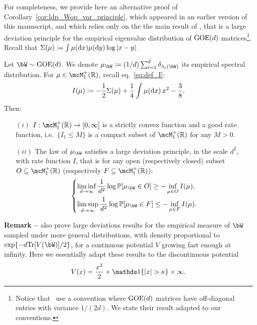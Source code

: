 For completeness, we provide here an alternative proof of Corollary~\ref{cor:ldp_Wop_var_principle}, which appeared in an earlier version of this manuscript,
and which relies only on the 
the main result of \cite{arous1997large}, that is a large deviation principle for the empirical eigenvalue distribution of $\mathrm{GOE}(d)$ matrices\footnote{
    Notice that~\cite{arous1997large} use a convention where $\mathrm{GOE}(d)$ matrices have off-diagonal entries with variance $1/(2d)$. We state their result adapted to our conventions.
}.
Recall that $\Sigma(\mu) \coloneqq \int \mu(\mathrm{d} x) \mu(\mathrm{d} y) \log |x-y|$.
\begin{proposition}\label{prop:ldp_emeasure}
    Let $\bW \sim \GOE(d)$. 
    We denote $\mu_{\bW} \coloneqq (1/d) \sum_{i=1}^d \delta_{\lambda_i(\bW)}$ its empirical spectral distribution. 
    For $\mu \in \mcM_1^+(\bbR)$, recall eq.~\eqref{eq:def_I}:
    \begin{equation*}
        I(\mu) \coloneqq -\frac{1}{2} \Sigma(\mu) + \frac{1}{4} \int \mu(\mathrm{d} x) \, x^2 - \frac{3}{8}.
    \end{equation*}
    Then: 
    \begin{itemize}
        \item[$(i)$] $I : \mcM_1^+(\bbR) \to [0, \infty]$ is a strictly convex function and a good rate function, i.e.\  
        $\{I_1 \leq M\}$ is a compact subset of $\mcM_1^+(\bbR)$ for any $M > 0$.
        \item[$(ii)$]
        The law of $\mu_\bW$ satisfies a large deviation principle, in the scale $d^2$, with rate function $I$, that is for any 
        open (respectively closed) subset $O \subseteq \mcM_1^+(\bbR)$ (respectively $F \subseteq \mcM_1^+(\bbR)$): 
        \begin{equation*}
            \begin{dcases}
                \liminf_{d\to\infty} \frac{1}{d^2} \log \bbP[\mu_\bW \in O] \geq - \inf_{\mu \in O} I(\mu), \\
                \limsup_{d\to\infty} \frac{1}{d^2} \log \bbP[\mu_\bW \in F] \leq - \inf_{\mu \in F} I(\mu).
            \end{dcases}
        \end{equation*}
    \end{itemize}
\end{proposition}

\myskip
\textbf{Remark --}
\cite{arous1997large} also prove large deviations results for the empirical measure of $\bW$ sampled under more general distributions, with density 
proportional to $\exp\{-d\Tr[V(\bW)]/2\}$, for a continuous potential $V$ growing fast enough at infinity.
Here we essentially adapt these results to the discontinuous potential
\begin{equation*}
    V(x) = \frac{x^2}{2} + \indi\{|x| > \kappa\} \times \infty.
\end{equation*}

